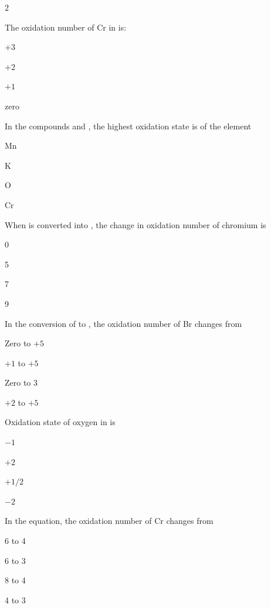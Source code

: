\documentclass[10pt,a4paper]{article}
\begin{document}
\begin{multicols}{2}
\begin{questions}[start=56]
\item The oxidation number of Cr in \ce{[Cr(NH3)4Cl2]+} is:
\begin{options}
  \item $+3$
  \item $+2$
  \item $+1$
  \item zero
\end{options}

\item In the compounds  and , the highest oxidation state is of the element
\begin{options}
  \item Mn
  \item K
  \item O
  \item Cr
\end{options}

\item When  is converted into , the change in oxidation number of chromium is
\begin{options}
  \item 0
  \item 5
  \item 7
  \item 9
\end{options}

\item In the conversion of  to , the oxidation number of Br changes from
\begin{options}
  \item Zero to $+5$
  \item $+1$ to $+5$
  \item Zero to 3
  \item $+2$ to $+5$
\end{options}

\item Oxidation state of oxygen in  is
\begin{options}
  \item $-1$
  \item $+2$
  \item $+1/2$
  \item $-2$
\end{options}

\item In the equation,  the oxidation number of Cr changes from
\begin{options}
  \item 6 to 4
  \item 6 to 3
  \item 8 to 4
  \item 4 to 3
\end{options}


\end{questions}
\end{multicols}
\end{document}
